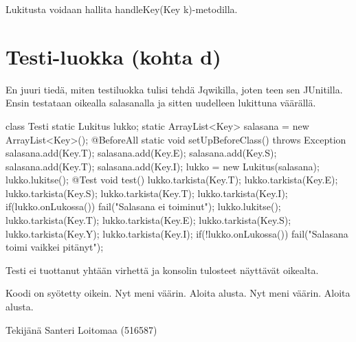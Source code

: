 Lukitusta voidaan hallita handleKey(Key k)-metodilla.

\pagebreak

\section{Testi-luokka (kohta d)}

\label{Testi-luokka}

En juuri tiedä, miten testiluokka tulisi tehdä Jqwikilla, joten teen sen JUnitilla. Ensin testataan oikealla salasanalla ja sitten uudelleen lukittuna väärällä.


\begin{javacode}
class Testi {
  static Lukitus lukko;
  static ArrayList<Key> salasana = new ArrayList<Key>();
  @BeforeAll
  static void setUpBeforeClass() throws Exception {
    salasana.add(Key.T);
    salasana.add(Key.E);
    salasana.add(Key.S);
    salasana.add(Key.T);
    salasana.add(Key.I);
    lukko = new Lukitus(salasana);
    lukko.lukitse();
  }
  @Test
  void test() {
    lukko.tarkista(Key.T);
    lukko.tarkista(Key.E);
    lukko.tarkista(Key.S);
    lukko.tarkista(Key.T);
    lukko.tarkista(Key.I);
    if(lukko.onLukossa()) {
      fail("Salasana ei toiminut");
    }
    lukko.lukitse();
    lukko.tarkista(Key.T);
    lukko.tarkista(Key.E);
    lukko.tarkista(Key.S);
    lukko.tarkista(Key.Y);
    lukko.tarkista(Key.I);
    if(!lukko.onLukossa()) {
      fail("Salasana toimi vaikkei pitänyt");
    }
  }
}
\end{javacode}

\pagebreak 

Testi ei tuottanut yhtään virhettä ja konsolin tulosteet näyttävät oikealta.

\begin{javacode}
Koodi on syötetty oikein.
Nyt meni väärin. Aloita alusta.
Nyt meni väärin. Aloita alusta.
\end{javacode}

Tekijänä Santeri Loitomaa (516587)